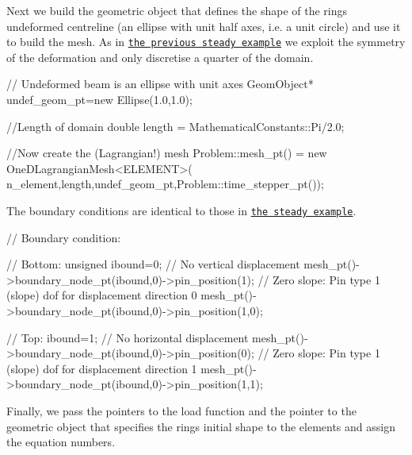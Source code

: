 Next we build the geometric object that defines the shape of the ring\textquotesingle{}s undeformed centreline (an ellipse with unit half axes, i.\+e. a unit circle) and use it to build the mesh. As in \href{../../steady_ring/html/index.html}{\tt the previous steady example} we exploit the symmetry of the deformation and only discretise a quarter of the domain.


\begin{DoxyCodeInclude}

 \textcolor{comment}{// Undeformed beam is an ellipse with unit axes}
 GeomObject* undef\_geom\_pt=\textcolor{keyword}{new} Ellipse(1.0,1.0); 

 \textcolor{comment}{//Length of domain}
 \textcolor{keywordtype}{double} length = MathematicalConstants::Pi/2.0;
 
 \textcolor{comment}{//Now create the (Lagrangian!) mesh}
 Problem::mesh\_pt() = \textcolor{keyword}{new} OneDLagrangianMesh<ELEMENT>(
  n\_element,length,undef\_geom\_pt,Problem::time\_stepper\_pt()); 

\end{DoxyCodeInclude}


The boundary conditions are identical to those in \href{../../steady_ring/html/index.html}{\tt the steady example}.


\begin{DoxyCodeInclude}

 \textcolor{comment}{// Boundary condition: }

 \textcolor{comment}{// Bottom: }
 \textcolor{keywordtype}{unsigned} ibound=0;
 \textcolor{comment}{// No vertical displacement}
 mesh\_pt()->boundary\_node\_pt(ibound,0)->pin\_position(1); 
 \textcolor{comment}{// Zero slope: Pin type 1 (slope) dof for displacement direction 0 }
 mesh\_pt()->boundary\_node\_pt(ibound,0)->pin\_position(1,0);

 \textcolor{comment}{// Top: }
 ibound=1;
 \textcolor{comment}{// No horizontal displacement}
 mesh\_pt()->boundary\_node\_pt(ibound,0)->pin\_position(0); 
 \textcolor{comment}{// Zero slope: Pin type 1 (slope) dof for displacement direction 1}
 mesh\_pt()->boundary\_node\_pt(ibound,0)->pin\_position(1,1); 

\end{DoxyCodeInclude}


Finally, we pass the pointers to the load function and the pointer to the geometric object that specifies the ring\textquotesingle{}s initial shape to the elements and assign the equation numbers.


